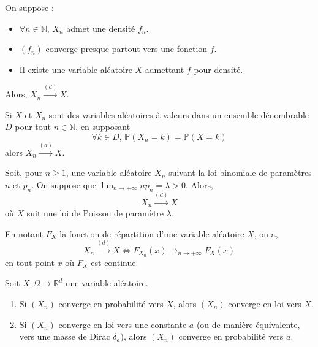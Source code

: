   \begin{corollary}
    On suppose :
    \begin{itemize}
      \item $\forall n \in \mathbb{N}$, $X_n$ admet une densité $f_n$.
      \item $(f_n)$ converge presque partout vers une fonction $f$.
      \item Il existe une variable aléatoire $X$ admettant $f$ pour densité.
    \end{itemize}
    Alors, $X_n \overset{(d)}{\longrightarrow} X$.
  \end{corollary}

  \begin{corollary}
    Si $X$ et $X_n$ sont des variables aléatoires à valeurs dans un ensemble dénombrable $D$ pour tout $n \in \mathbb{N}$, en supposant
    \[ \forall k \in D, \, \mathbb{P}(X_n = k) = \mathbb{P}(X = k) \]
    alors $X_n \overset{(d)}{\longrightarrow} X$.
  \end{corollary}

  \begin{application}
    Soit, pour $n \geq 1$, une variable aléatoire $X_n$ suivant la loi binomiale de paramètres $n$ et $p_n$. On suppose que $\lim_{n \rightarrow +\infty} n p_n = \lambda > 0$.
    Alors,
    \[ X_n \overset{(d)}{\longrightarrow} X \]
    où $X$ suit une loi de Poisson de paramètre $\lambda$.
  \end{application}


  \begin{theorem}
    En notant $F_X$ la fonction de répartition d'une variable aléatoire $X$, on a,
    \[ X_n \overset{(d)}{\longrightarrow} X \iff F_{X_n}(x) \longrightarrow_{n \rightarrow +\infty} F_X(x) \]
    en tout point $x$ où $F_X$ est continue.
  \end{theorem}

  \begin{theorem}
    Soit $X : \Omega \rightarrow \mathbb{R}^d$ une variable aléatoire.
    \begin{enumerate}[label=(\roman*)]
      \item Si $(X_n)$ converge en probabilité vers $X$, alors $(X_n)$ converge en loi vers $X$.
      \item Si $(X_n)$ converge en loi vers une constante $a$ (ou de manière équivalente, vers une masse de Dirac $\delta_a$), alors $(X_n)$ converge en probabilité vers $a$.
    \end{enumerate}
  \end{theorem}

